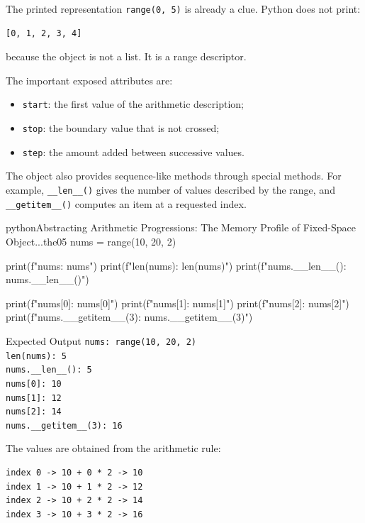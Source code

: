 \documentclass[a4paper,twoside]{report}
\begin{document}
The printed representation \texttt{range(0, 5)} is already a clue. Python does not print:

\begin{verbatim}
[0, 1, 2, 3, 4]
\end{verbatim}

because the object is not a list. It is a range descriptor.

The important exposed attributes are:

\begin{itemize}
    \item \texttt{start}: the first value of the arithmetic description;
    \item \texttt{stop}: the boundary value that is not crossed;
    \item \texttt{step}: the amount added between successive values.
\end{itemize}

The object also provides sequence-like methods through special methods. For example, \texttt{\_\_len\_\_()} gives the number of values described by the range, and \texttt{\_\_getitem\_\_()} computes an item at a requested index.

\begin{codebox}[]{python}{Abstracting Arithmetic Progressions: The Memory Profile of Fixed-Space Object...}{the05}
nums = range(10, 20, 2)

print(f"nums: {nums}")
print(f"len(nums): {len(nums)}")
print(f"nums.__len__(): {nums.__len__()}")

print(f"nums[0]: {nums[0]}")
print(f"nums[1]: {nums[1]}")
print(f"nums[2]: {nums[2]}")
print(f"nums.__getitem__(3): {nums.__getitem__(3)}")
\end{codebox}


\begin{iobox}{Expected Output}
\texttt{nums: range(10, 20, 2)} \\
\texttt{len(nums): 5} \\
\texttt{nums.\_\_len\_\_(): 5} \\
\texttt{nums[0]: 10} \\
\texttt{nums[1]: 12} \\
\texttt{nums[2]: 14} \\
\texttt{nums.\_\_getitem\_\_(3): 16} \\
\end{iobox}


The values are obtained from the arithmetic rule:

\begin{verbatim}
index 0 -> 10 + 0 * 2 -> 10
index 1 -> 10 + 1 * 2 -> 12
index 2 -> 10 + 2 * 2 -> 14
index 3 -> 10 + 3 * 2 -> 16
\end{verbatim}
\end{document}
